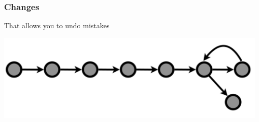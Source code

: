   \begin{frame}[t]
    \frametitle{Changes}
    That allows you to undo mistakes
    \begin{center}
      \includegraphics[width=0.98\textwidth]{./images/from-wickham-06} 
    \end{center} 
  \end{frame}
